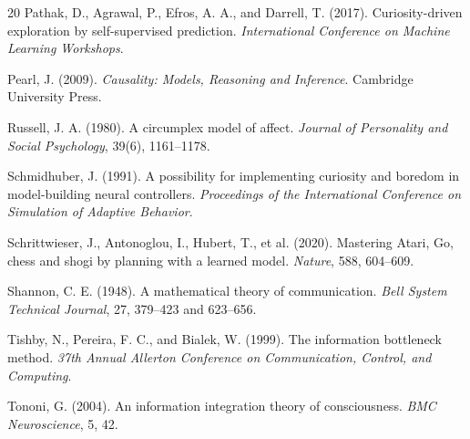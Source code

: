 \documentclass[11pt]{article}
\begin{document}
\begin{thebibliography}{20}
Pathak, D., Agrawal, P., Efros, A. A., and Darrell, T. (2017).
\newblock Curiosity-driven exploration by self-supervised prediction.
\newblock \emph{International Conference on Machine Learning Workshops}.

Pearl, J. (2009).
\newblock \emph{Causality: Models, Reasoning and Inference}.
\newblock Cambridge University Press.

Russell, J. A. (1980).
\newblock A circumplex model of affect.
\newblock \emph{Journal of Personality and Social Psychology}, 39(6), 1161--1178.

Schmidhuber, J. (1991).
\newblock A possibility for implementing curiosity and boredom in model-building neural controllers.
\newblock \emph{Proceedings of the International Conference on Simulation of Adaptive Behavior}.

Schrittwieser, J., Antonoglou, I., Hubert, T., et al. (2020).
\newblock Mastering Atari, Go, chess and shogi by planning with a learned model.
\newblock \emph{Nature}, 588, 604--609.

Shannon, C. E. (1948).
\newblock A mathematical theory of communication.
\newblock \emph{Bell System Technical Journal}, 27, 379--423 and 623--656.

Tishby, N., Pereira, F. C., and Bialek, W. (1999).
\newblock The information bottleneck method.
\newblock \emph{37th Annual Allerton Conference on Communication, Control, and Computing}.

Tononi, G. (2004).
\newblock An information integration theory of consciousness.
\newblock \emph{BMC Neuroscience}, 5, 42.

\end{thebibliography}
\end{document}
